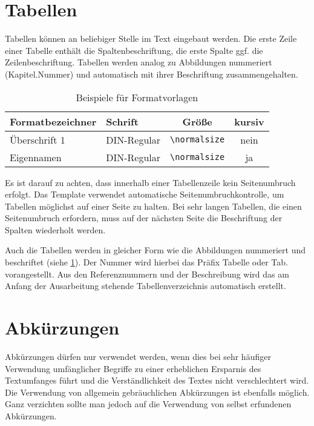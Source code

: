 \section{Tabellen}
\label{sec:tabellen}

Tabellen können an beliebiger Stelle im Text eingebaut werden. Die erste Zeile einer Tabelle enthält die Spaltenbeschriftung, die erste Spalte ggf. die Zeilenbeschriftung. Tabellen werden analog zu Abbildungen nummeriert (Kapitel.Nummer) und automatisch mit ihrer Beschriftung zusammengehalten.

\begin{table}[h]
	\centering
	\caption{Beispiele für Formatvorlagen}
	\label{tab:formatvorlagen}
	\begin{tabular}{|l|l|c|c|}
		\hline
		\textbf{Formatbezeichner} & \textbf{Schrift} & \textbf{Größe}                     & \textbf{kursiv} \\
		\hline
		Überschrift 1             & DIN-Regular      & \texttt{\textbackslash normalsize} & nein            \\
		Eigennamen                & DIN-Regular      & \texttt{\textbackslash normalsize} & ja              \\
		\hline
	\end{tabular}
\end{table}

Es ist darauf zu achten, dass innerhalb einer Tabellenzeile kein Seitenumbruch erfolgt. Das Template verwendet automatische Seitenumbruchkontrolle, um Tabellen möglichst auf einer Seite zu halten. Bei sehr langen Tabellen, die einen Seitenumbruch erfordern, muss auf der nächsten Seite die Beschriftung der Spalten wiederholt werden.

Auch die Tabellen werden in gleicher Form wie die Abbildungen nummeriert und beschriftet (siehe \cref{tab:formatvorlagen}). Der Nummer wird hierbei das Präfix Tabelle oder Tab. vorangestellt. Aus den Referenznummern und der Beschreibung wird das am Anfang der Ausarbeitung stehende Tabellenverzeichnis automatisch erstellt.

\section{Abkürzungen}
\label{sec:abkuerzungen}

Abkürzungen dürfen nur verwendet werden, wenn dies bei sehr häufiger Verwendung umfänglicher Begriffe zu einer erheblichen Ersparnis des Textumfanges führt und die Verständlichkeit des Textes nicht verschlechtert wird. Die Verwendung von allgemein gebräuchlichen Abkürzungen ist ebenfalls möglich. Ganz verzichten sollte man jedoch auf die Verwendung von selbst erfundenen Abkürzungen.

